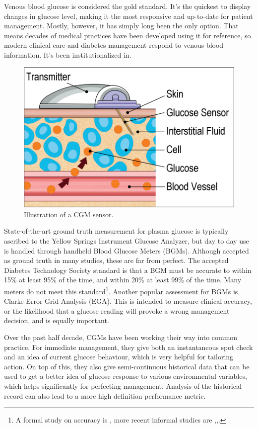 Venous blood glucose is considered the gold standard.  It’s the quickest to display changes in glucose level, making it the most responsive and up-to-date for patient management. Mostly, however, it has simply long been the only option. That means decades of medical practices have been developed using it for reference, so modern clinical care and diabetes management respond to venous blood information. It’s been institutionalized in. 

\begin{figure}[ht]
\centering\includegraphics[width=0.5\linewidth]{images/cgm.png}
\caption{Illustration of a CGM sensor.}
\label{fig:cgmsensor}
\end{figure}

State-of-the-art ground truth measurement for plasma glucose is typically ascribed to the Yellow Springs Instrument Glucose Analyzer, but day to day use is handled through handheld Blood Glucose Meters (BGMs). Although accepted as ground truth in many studies, these are far from perfect. The accepted Diabetes Technology Society standard is that a BGM must be accurate to within 15\% at least 95\% of the time, and within 20\% at least 99\% of the time\cite{noauthor_fda_2016}. Many meters do not meet this standard\footnote{A formal study on accuracy is \cite{clarke_evaluating_1987}, more recent informal studies are \cite{scheiner_2016_nodate},\cite{noauthor_are_2017},\cite{edelman_blood_2013}.}. Another popular assessment for BGMs is Clarke Error Grid Analysis (EGA). This is intended to measure clinical accuracy, or the likelihood that a glucose reading will provoke a wrong management decision, and is equally important.

Over the past half decade, CGMs have been working their way into common practice. For immediate management, they give both an instantaneous spot check and an idea of current glucose behaviour, which is very helpful for tailoring action. On top of this, they also give semi-continuous historical data that can be used to get a better idea of glucose response to various environmental variables, which helps significantly for perfecting management. Analysis of the historical record can also lead to a more high definition performance metric.

